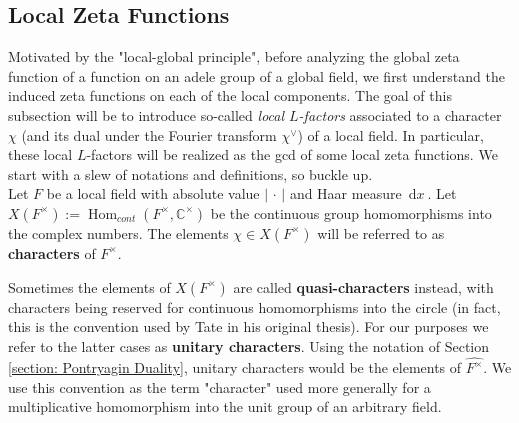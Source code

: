 \documentclass[11pt, x11names]{book}
\newcommand{\cc}{\mathbb{C}}
\newcommand{\abs}[1]{\left| \, #1  \,\right|}
\renewcommand{\hat}{\widehat}
\DeclareMathOperator{\Hom}{Hom}
\newcommand{\dx}{\, \mathrm{d}x \ }
\begin{document}
\subsection{Local Zeta Functions}
Motivated by the "local-global principle", before analyzing the global zeta function of a function on an adele group of a global field, we first understand the induced zeta functions on each of the local components. The goal of this subsection will be to introduce so-called \textit{local $L$-factors} associated to a character $\chi$ (and its dual under the Fourier transform $\chi^\lor$) of a local field. In particular, these local $L$-factors will be realized as the gcd of some local zeta functions. We start with a slew of notations and definitions, so buckle up.\\

Let $F$ be a local field with absolute value $\abs{\cdot}$ and Haar measure $\dx$.
Let $X(F^\times) := \Hom_{cont}(F^\times, \cc^\times)$ be the continuous group homomorphisms into the complex numbers. The elements $\chi \in X(F^\times)$ will be referred to as \textbf{characters} of $F^\times$.
\begin{remark}
    Sometimes the elements of $X(F^\times)$ are called \textbf{quasi-characters} instead, with characters being reserved for continuous homomorphisms into the circle (in fact, this is the convention used by Tate in his original thesis). For our purposes we refer to the latter cases as \textbf{unitary characters}. Using the notation of Section \ref{section: Pontryagin Duality}, unitary characters would be the elements of $\hat{F^\times}$. We use this convention as the term "character" used more generally for a multiplicative homomorphism into the unit group of an arbitrary field.
\end{remark}
\end{document}
